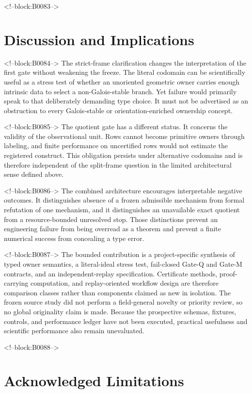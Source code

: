 \documentclass[11pt,a4paper]{article}
\begin{document}
<!--block:B0083-->
\section{Discussion and Implications}

<!--block:B0084-->
The strict-frame clarification changes the interpretation of the first gate without weakening the freeze. The literal codomain can be scientifically useful as a stress test of whether an unoriented geometric owner carries enough intrinsic data to select a non-Galois-stable branch. Yet failure would primarily speak to that deliberately demanding type choice. It must not be advertised as an obstruction to every Galois-stable or orientation-enriched ownership concept.

<!--block:B0085-->
The quotient gate has a different status. It concerns the validity of the observational unit. Rows cannot become primitive owners through labeling, and finite performance on uncertified rows would not estimate the registered construct. This obligation persists under alternative codomains and is therefore independent of the split-frame question in the limited architectural sense defined above.

<!--block:B0086-->
The combined architecture encourages interpretable negative outcomes. It distinguishes absence of a frozen admissible mechanism from formal refutation of one mechanism, and it distinguishes an unavailable exact quotient from a resource-bounded unresolved stop. Those distinctions prevent an engineering failure from being overread as a theorem and prevent a finite numerical success from concealing a type error.

<!--block:B0087-->
The bounded contribution is a project-specific synthesis of typed owner semantics, a literal-ideal stress test, fail-closed Gate-Q and Gate-M contracts, and an independent-replay specification. Certificate methods, proof-carrying computation, and replay-oriented workflow design are therefore comparison classes rather than components claimed as new in isolation. The frozen source study did not perform a field-general novelty or priority review, so no global originality claim is made. Because the prospective schemas, fixtures, controls, and performance ledger have not been executed, practical usefulness and scientific performance also remain unevaluated.

<!--block:B0088-->
\section{Acknowledged Limitations}
\end{document}

